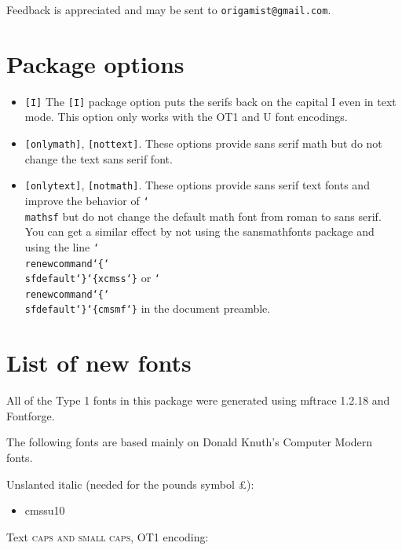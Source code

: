 \documentclass{amsart}
\begin{document}
Feedback is appreciated and may be sent to \texttt{origamist@gmail.com}.

\section{Package options}

\begin{itemize}
\item \texttt{[I]} The \texttt{[I]} package option puts the serifs back on the capital I even in text mode. This option only works with the OT1 and U font encodings.
\item \texttt{[onlymath]}, \texttt{[nottext]}. These options provide sans serif math but do not change the text sans serif font.
\item \texttt{[onlytext]}, \texttt{[notmath]}. These options provide sans serif text fonts and improve the behavior of \texttt{\char`\\mathsf} but do not change the default math font from roman to sans serif. You can get a similar effect by not using the \textsf{sansmathfonts} package and using the line \texttt{\char`\\renewcommand\char`\{\char`\\sfdefault\char`\}\char `\{xcmss\char`\}}
or
\texttt{\char`\\renewcommand\char`\{\char`\\sfdefault\char`\}\char `\{cmsmf\char`\}}
in the document preamble.
\end{itemize}



\section{List of new fonts}\label{sec:fonts}

All of the Type 1 fonts in this package were generated using mftrace 1.2.18 and Fontforge.

The following fonts are based mainly on Donald Knuth's Computer Modern fonts.

\textsf{\selectfont Unslanted italic} (needed for the pounds symbol \textsf{\pounds}):
\begin{itemize}
\item \textsf{cmssu10}
\end{itemize}

Text \textsf{\textsc{caps and small caps}}, OT1 encoding:

\nobreak
\end{document}
